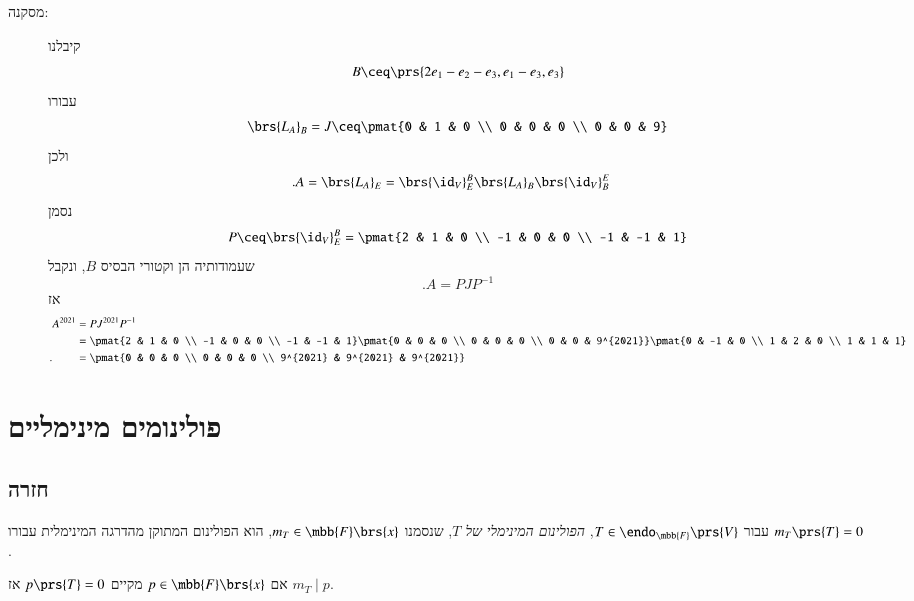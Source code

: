 \documentclass[a4paper,10pt,oneside,openany]{article}
\begin{document}
\begin{solution}
\begin{enumerate}
\begin{description}
\item[מסקנה:]
קיבלנו
\[B \ceq \prs{2e_1 - e_2 - e_3, e_1 - e_3, e_3}\]
עבורו
\[\brs{L_A}_B = J \ceq \pmat{0 & 1 & 0 \\ 0 & 0 & 0 \\ 0 & 0 & 9}\]
ולכן
\begin{align*}
\text{.} A &= \brs{L_A}_E
= \brs{\id_V}^{B}_E \brs{L_A}_B \brs{\id_V}^E_B
\end{align*}
נסמן
\[P \ceq \brs{\id_V}^B_E = \pmat{2 & 1 & 0 \\ -1 & 0 & 0 \\ -1 & -1 & 1}\]
שעמודותיה הן וקטורי הבסיס
$B$,
ונקבל
\[\text{.} A = P J P^{-1}\]
אז
\begin{align*}
A^{2021} &= P J^{2021} P^{-1}
\\&= \pmat{2 & 1 & 0 \\ -1 & 0 & 0 \\ -1 & -1 & 1} \pmat{0 & 0 & 0 \\ 0 & 0 & 0 \\ 0 & 0 & 9^{2021}} \pmat{0 & -1 & 0 \\ 1 & 2 & 0 \\ 1 & 1 & 1}
\\ \text{.} \hphantom{A^{2021}} &= \pmat{0 & 0 & 0 \\ 0 & 0 & 0 \\ 9^{2021} & 9^{2021} & 9^{2021}}
\end{align*}
\end{description}
\end{enumerate}
\end{solution}

\section{פולינומים מינימליים}

\subsection{חזרה}

\begin{definition}
עבור
$T \in \endo_{\mbb{F}}\prs{V}$,
\emph{הפולינום המינימלי של
$T$},
שנסמנו
$m_T \in \mbb{F}\brs{x}$,
הוא הפולינום המתוקן מהדרגה המינימלית עבורו
$m_T\prs{T} = 0$.
\end{definition}

\begin{proposition}
אם
$p \in \mbb{F}\brs{x}$
מקיים
$p\prs{T} = 0$
אז
$m_T \mid p$.
\end{proposition}
\end{document}
